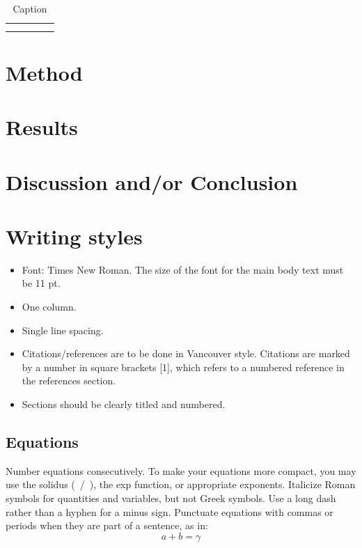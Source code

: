 \documentclass[conference,onecolumn,11pt]{IEEEtran}
\begin{document}
\begin{table}
    \centering
    \begin{tabular}{ccccc}
         &  &  &  & \\
         &  &  &  & \\
    \end{tabular}
    \caption{Caption}
    \label{tab:my_label}
\end{table}


\section{Method}
\section{Results}
\section{Discussion and/or Conclusion}

\section{Writing styles}

\begin{itemize}
\item Font: Times New Roman. The size of the font for the main body text must be 11 pt. 
\item One column. 
\item Single line spacing. 
\item Citations/references are to be done in Vancouver style. Citations are marked by a number in square brackets [1], which refers to a numbered reference in the references section. 
\item Sections should be clearly titled and numbered. 
\end{itemize}

\subsection{Equations}
Number equations consecutively. To make your 
equations more compact, you may use the solidus (~/~), the exp function, or 
appropriate exponents. Italicize Roman symbols for quantities and variables, 
but not Greek symbols. Use a long dash rather than a hyphen for a minus 
sign. Punctuate equations with commas or periods when they are part of a 
sentence, as in:
\begin{equation}
a+b=\gamma\label{eq}
\end{equation}
\end{document}
